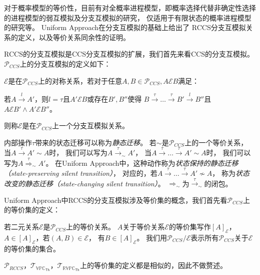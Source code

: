    对于概率模型的等价性，目前有对全概率进程模型，即概率选择代替非确定性选择的进程模型的弱互模拟及分支互模拟的研究\cite{全概率的弱互模拟和分支互模拟}，
   仅适用于有限状态的概率进程模型的研究\cite{有限状态_1,有限状态_2}等。
   Uniform Approach在分支互模拟\cite{Branching_1, Branching_2}的基础上给出了
   RCCS分支互模拟关系的定义，以及等价关系同余性的证明\cite{Fu_UniformApproach}。
   
   RCCS的分支互模拟是CCS分支互模拟的扩展，我们首先来看CCS的分支互模拟。
   $\mathcal{P}_{CCS}$上的分支互模拟的定义如下：
   \begin{definition}\label{def:branching0}
      $\mathcal{E}$是在$\mathcal{P}_{CCS}$上的对称关系，若对于任意$A,B\in \mathcal{P}_{CCS},A\mathcal{E}B$满足：

            若$A\stackrel{l}{\rightarrow}A'$，则$l=\tau$且$A'\mathcal{E}B$或存在$B',B''$使得
            $B\stackrel{\tau}{\rightarrow}\dots\stackrel{\tau}{\rightarrow}B'\stackrel{l}{\rightarrow}B''$且$A\mathcal{E}B'\wedge A'\mathcal{E}B''$。

            则称$\mathcal{E}$是在$\mathcal{P}_{CCS}$上一个分支互模拟关系。
   \end{definition}
   
   内部操作$\tau$带来的状态迁移可以称为\textit{静态迁移}。
   若$\sim$是$\mathcal{P}_{CCS}$上的一个等价关系，
   当$A\stackrel{\tau}{\rightarrow}A'\sim A$时，
   我们可以写为$A\stackrel{\tau}{\rightarrow}_{\sim}A'$，
   当$A\stackrel{\tau}{\rightarrow}\dots \stackrel{\tau}{\rightarrow}A'\sim A$时，
   我们可以写为$A\stackrel{\tau}{\Rightarrow}_{\sim}A'$。
   在Uniform Approach中，这种动作称为\textit{状态保持的静态迁移（state-preserving silent transition）}，
   对应的，若$A\stackrel{\tau}{\rightarrow}\dots \stackrel{\tau}{\rightarrow}A'\not\sim A$，
   称为\textit{状态改变的静态迁移（state-changing silent transition）}。
   $\Rightarrow_{\sim}$为$\stackrel{\tau}{\rightarrow}_{\sim}$的闭包\cite{Fu_UniformApproach}。

   Uniform Approach中RCCS的分支互模拟涉及等价集的概念，我们首先看$\mathcal{P}_{CCS}$上的等价集的定义：
   \begin{definition}
      若二元关系$\mathcal{E}$是$\mathcal{P}_{CCS}$上的等价关系。
      $A$关于等价关系$\mathcal{E}$的等价集写作$[A]_{\mathcal{E}}$，
      $A\in [A]_{\mathcal{E}}$，若$(A,B)\in \mathcal{E}$，
      有$B\in [A]_{\mathcal{E}}$。
      我们用$\mathcal{P}_{CCS}/\mathcal{E}$表示所有$\mathcal{P}_{CCS}$关于$\mathcal{E}$的等价集的集合。
   \end{definition}
   $\mathcal{P}_{RCCS}$，$\mathcal{T}_{\mathbb{VPC}_{\mathsf{Th}}}$，$\mathcal{T}_{\mathbb{RVPC}_{\mathsf{Th}}}$上的等价集的定义都是相似的，因此不做赘述。

